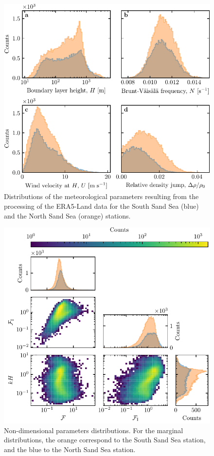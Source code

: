\begin{figure}[p]
\centering
\includegraphics[scale=1]{Figures/Figure9_supp.pdf}
\caption{Distributions of the meteorological parameters resulting from the processing of the ERA5-Land data for the South Sand Sea (blue) and the North Sand Sea (orange) stations.}
\label{Fig9_supp}
\end{figure}

\begin{figure}[p]
\centering
\includegraphics[scale=1]{Figures/Figure10_supp.pdf}
\caption{Non-dimensional parameters distributions. For the marginal distributions, the orange correspond to the South Sand Sea station, and the blue to the North Sand Sea station.}
\label{Fig10_supp}
\end{figure}


